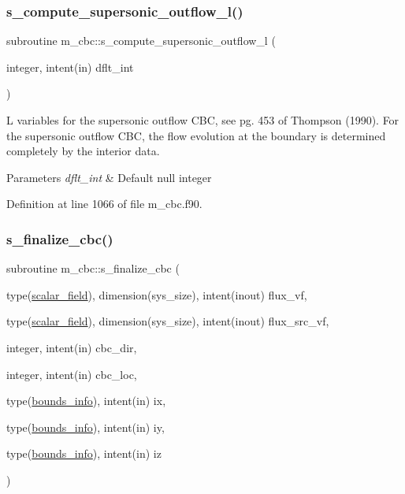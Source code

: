 \subsubsection{\texorpdfstring{s\+\_\+compute\+\_\+supersonic\+\_\+outflow\+\_\+l()}{s\_compute\_supersonic\_outflow\_l()}}
{\footnotesize\ttfamily subroutine m\+\_\+cbc\+::s\+\_\+compute\+\_\+supersonic\+\_\+outflow\+\_\+l (\begin{DoxyParamCaption}\item[{integer, intent(in)}]{dflt\+\_\+int }\end{DoxyParamCaption})}



L variables for the supersonic outflow C\+BC, see pg. 453 of Thompson (1990). For the supersonic outflow C\+BC, the flow evolution at the boundary is determined completely by the interior data. 


\begin{DoxyParams}{Parameters}
{\em dflt\+\_\+int} & Default null integer \\
\hline
\end{DoxyParams}


Definition at line 1066 of file m\+\_\+cbc.\+f90.

\mbox{\label{namespacem__cbc_a3fcf7cde1a04a7ee72ced4aa62cf53d0}} 
\subsubsection{\texorpdfstring{s\+\_\+finalize\+\_\+cbc()}{s\_finalize\_cbc()}}
{\footnotesize\ttfamily subroutine m\+\_\+cbc\+::s\+\_\+finalize\+\_\+cbc (\begin{DoxyParamCaption}\item[{type(\hyperlink{structm__derived__types_1_1scalar__field}{scalar\+\_\+field}), dimension(sys\+\_\+size), intent(inout)}]{flux\+\_\+vf,  }\item[{type(\hyperlink{structm__derived__types_1_1scalar__field}{scalar\+\_\+field}), dimension(sys\+\_\+size), intent(inout)}]{flux\+\_\+src\+\_\+vf,  }\item[{integer, intent(in)}]{cbc\+\_\+dir,  }\item[{integer, intent(in)}]{cbc\+\_\+loc,  }\item[{type(\hyperlink{structm__derived__types_1_1bounds__info}{bounds\+\_\+info}), intent(in)}]{ix,  }\item[{type(\hyperlink{structm__derived__types_1_1bounds__info}{bounds\+\_\+info}), intent(in)}]{iy,  }\item[{type(\hyperlink{structm__derived__types_1_1bounds__info}{bounds\+\_\+info}), intent(in)}]{iz }\end{DoxyParamCaption})}



